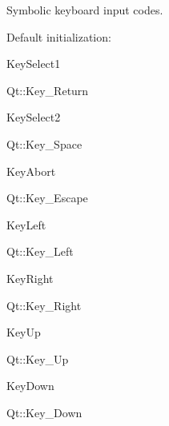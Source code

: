Symbolic keyboard input codes. 

Default initialization\-:
\begin{DoxyItemize}
\item Key\-Select1\par
 Qt\-::\-Key\-\_\-\-Return
\item Key\-Select2\par
 Qt\-::\-Key\-\_\-\-Space
\item Key\-Abort\par
 Qt\-::\-Key\-\_\-\-Escape
\end{DoxyItemize}


\begin{DoxyItemize}
\item Key\-Left\par
 Qt\-::\-Key\-\_\-\-Left
\item Key\-Right\par
 Qt\-::\-Key\-\_\-\-Right
\item Key\-Up\par
 Qt\-::\-Key\-\_\-\-Up
\item Key\-Down\par
 Qt\-::\-Key\-\_\-\-Down
\end{DoxyItemize}


